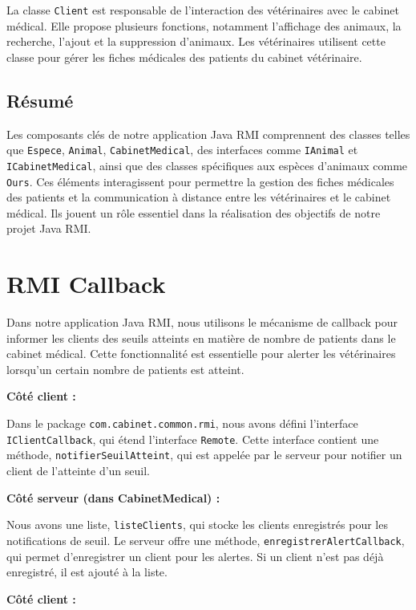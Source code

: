 \documentclass{article} %
\begin{document}
La classe \texttt{Client} est responsable de l'interaction des vétérinaires avec le cabinet médical. Elle propose plusieurs fonctions, notamment l'affichage des animaux, la recherche, l'ajout et la suppression d'animaux. Les vétérinaires utilisent cette classe pour gérer les fiches médicales des patients du cabinet vétérinaire.

\subsection{Résumé}

Les composants clés de notre application Java RMI comprennent des classes telles que \texttt{Espece}, \texttt{Animal}, \texttt{CabinetMedical}, des interfaces comme \texttt{IAnimal} et \texttt{ICabinetMedical}, ainsi que des classes spécifiques aux espèces d'animaux comme \texttt{Ours}. Ces éléments interagissent pour permettre la gestion des fiches médicales des patients et la communication à distance entre les vétérinaires et le cabinet médical. Ils jouent un rôle essentiel dans la réalisation des objectifs de notre projet Java RMI.

\section{RMI Callback}\label{sec:callback}

Dans notre application Java RMI, nous utilisons le mécanisme de callback pour informer les clients des seuils atteints en matière de nombre de patients dans le cabinet médical. Cette fonctionnalité est essentielle pour alerter les vétérinaires lorsqu'un certain nombre de patients est atteint.

\bigskip
\textbf{Côté client :}

Dans le package \texttt{com.cabinet.common.rmi}, nous avons défini l'interface \texttt{IClientCallback}, qui étend l'interface \texttt{Remote}. Cette interface contient une méthode, \texttt{notifierSeuilAtteint}, qui est appelée par le serveur pour notifier un client de l'atteinte d'un seuil.

\bigskip
\textbf{Côté serveur (dans CabinetMedical) :}

Nous avons une liste, \texttt{listeClients}, qui stocke les clients enregistrés pour les notifications de seuil. Le serveur offre une méthode, \texttt{enregistrerAlertCallback}, qui permet d'enregistrer un client pour les alertes. Si un client n'est pas déjà enregistré, il est ajouté à la liste.

\bigskip
\textbf{Côté client :}
\end{document}
